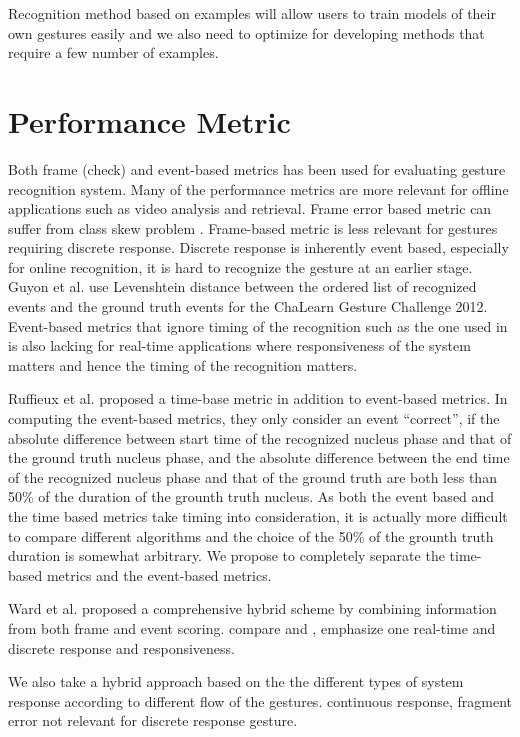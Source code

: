\documentclass[conference]{IEEEtran}
\begin{document}
Recognition method based on examples will allow users to train models of their
own gestures easily and we also need to optimize for developing methods that
require a few number of examples.

\section{Performance Metric}
Both frame \cite{song12} (check) and event-based \cite{guyon13} metrics has been
used for evaluating gesture recognition system. Many of the performance metrics are more relevant for
offline applications such as video analysis and retrieval. Frame error based
metric can suffer from class skew problem \cite{ward11}. Frame-based metric is
less relevant for gestures requiring discrete response. Discrete response is
inherently event based, especially for online recognition, it is hard to
recognize the gesture at an earlier stage. Guyon et al.
\cite{guyon13} use Levenshtein distance between the ordered list of
recognized events and the ground truth events for the ChaLearn
Gesture Challenge 2012. Event-based metrics that ignore timing of the
recognition such as the one used in \cite{guyon13} is also lacking for real-time
applications where responsiveness of the system matters and hence the timing of
the recognition matters.

Ruffieux et al. proposed a time-base metric \cite{Ruffieux2013} in addition to
event-based metrics. In computing the event-based metrics, they only consider an
event ``correct'', if the absolute difference between start time of the
recognized nucleus phase and that of the ground truth nucleus phase, and the
absolute difference between the end time of the recognized nucleus phase and
that of the ground truth are both less than 50\% of the duration of the grounth truth
nucleus. As both the event based and the time based metrics take timing into
consideration, it is actually more difficult to compare different algorithms and
the choice of the 50\% of the grounth truth duration is somewhat arbitrary. We
propose to completely separate the time-based metrics and the event-based
metrics.

Ward et al. \cite{ward11} proposed a comprehensive hybrid
scheme by combining information from both frame and event scoring. compare
\cite{Ruffieux2013} and \cite{ward11}, emphasize one real-time and discrete response and responsiveness.

We also take a hybrid approach based on the the different types of system
response according to different flow of the gestures. continuous response,
fragment error not relevant for discrete response gesture.
\end{document}
